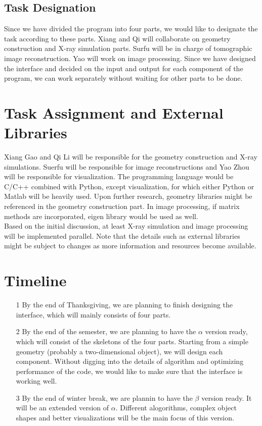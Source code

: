 \documentclass[11]{article}
\begin{document}
\subsection{Task Designation}
Since we have divided the program into four parts, we would like to designate the task according to these parts. Xiang and Qi will collaborate on geometry construction and X-ray simulation parts. Surfu will be in charge of tomographic image reconstruction. Yao will work on image processing. Since we have designed the interface and decided on the input and output for each component of the program, we can work separately without waiting for other parts to be done.

\section{Task Assignment and External Libraries}
Xiang Gao and Qi Li will be responsible for the geometry construction and X-ray simulations. Suerfu will be responsible for image reconstructions and Yao Zhou will be responsible for visualization. The programming language would be C/C++ combined with Python, except visualization, for which either Python or Matlab will be heavily used. Upon further research, geometry libraries might be referenced in the geometry construction part. In image processing, if matrix methods are incorporated, eigen library would be used as well.\\
Based on the initial discussion, at least X-ray simulation and image processing will be implemented parallel. Note that the details such as external libraries might be subject to changes as more information  and resources become available. 

\section{Timeline}
\begin{itemize}
\item[1] By the end of Thanksgiving, we are planning to finish designing the interface, which will mainly consists of four parts.\\
\item[2] By the end of the semester, we are planning to have the $\alpha$ version ready, which will consist of the skeletons of the four parts. Starting from a simple geometry (probably a two-dimensional object), we will design each component. Without digging into the details of algorithm and optimizing performance of the code, we would like to make sure that the interface is working well. 
\item[3] By the end of winter break, we are plannin to have the $\beta$ version ready. It will be an extended version of $\alpha$. Different alogorithms, complex object shapes and better visualizations will be the main focus of this version.
\end{itemize}
	
\end{document}
